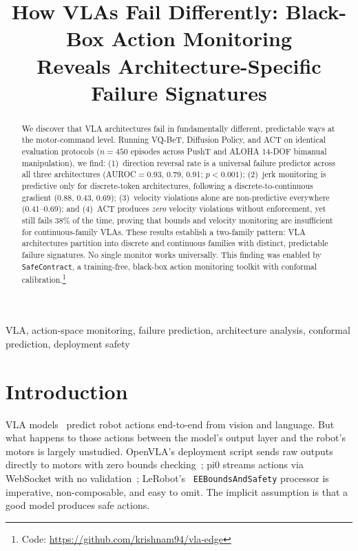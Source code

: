 \documentclass[conference]{IEEEtran}
\begin{document}
\title{How VLAs Fail Differently: Black-Box Action Monitoring\\Reveals Architecture-Specific Failure Signatures}

\author{
}

\maketitle

\begin{abstract}
We discover that VLA architectures fail in fundamentally different, predictable ways at the motor-command level.
Running VQ-BeT, Diffusion Policy, and ACT on identical evaluation protocols ($n{=}450$ episodes across PushT and ALOHA 14-DOF bimanual manipulation), we find:
(1)~direction reversal rate is a universal failure predictor across all three architectures (AUROC${=}$0.93, 0.79, 0.91; $p < 0.001$);
(2)~jerk monitoring is predictive only for discrete-token architectures, following a discrete-to-continuous gradient (0.88, 0.43, 0.69);
(3)~velocity violations alone are non-predictive everywhere (0.41--0.69);
and (4)~ACT produces \emph{zero} velocity violations without enforcement, yet still fails 38\% of the time, proving that bounds and velocity monitoring are insufficient for continuous-family VLAs.
These results establish a two-family pattern: VLA architectures partition into discrete and continuous families with distinct, predictable failure signatures.
No single monitor works universally.
This finding was enabled by \texttt{SafeContract}, a training-free, black-box action monitoring toolkit with conformal calibration.\footnote{Code: \url{https://github.com/krishnam94/vla-edge}}
\end{abstract}

\begin{IEEEkeywords}
VLA, action-space monitoring, failure prediction, architecture analysis, conformal prediction, deployment safety
\end{IEEEkeywords}

\section{Introduction}

VLA models~\cite{openvla,smolvla} predict robot actions end-to-end from vision and language.
But what happens to those actions between the model's output layer and the robot's motors is largely unstudied.
OpenVLA's deployment script sends raw outputs directly to motors with zero bounds checking~\cite{openvla};
pi0 streams actions via WebSocket with no validation~\cite{pi0};
LeRobot's~\cite{lerobot} \texttt{EEBoundsAndSafety} processor is imperative, non-composable, and easy to omit.
The implicit assumption is that a good model produces safe actions.
\end{document}
